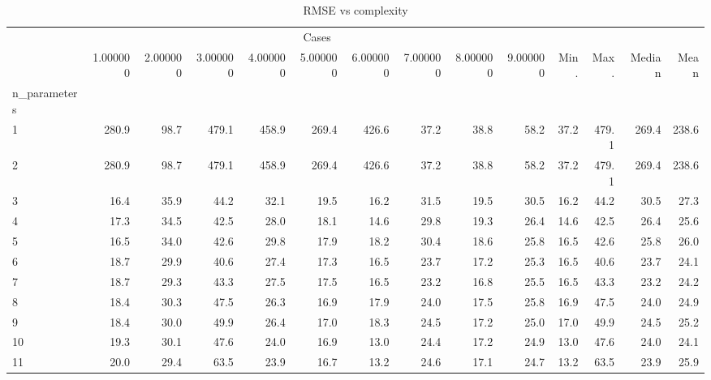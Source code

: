 \begin{table}[h]
\caption{RMSE vs complexity}
\label{tab:rmse_complexity}
\begin{tabular}{lrrrrrrrrrrrrr}
\toprule
 & \multicolumn{9}{c}{Cases} \\
\cmidrule(lr){2-10}
 & 1.000000 & 2.000000 & 3.000000 & 4.000000 & 5.000000 & 6.000000 & 7.000000 & 8.000000 & 9.000000 & Min. & Max. & Median & Mean \\
n_parameters &  &  &  &  &  &  &  &  &  &  &  &  &  \\
\midrule
1 & 280.9 & 98.7 & 479.1 & 458.9 & 269.4 & 426.6 & 37.2 & 38.8 & 58.2 & 37.2 & 479.1 & 269.4 & 238.6 \\
2 & 280.9 & 98.7 & 479.1 & 458.9 & 269.4 & 426.6 & 37.2 & 38.8 & 58.2 & 37.2 & 479.1 & 269.4 & 238.6 \\
3 & 16.4 & 35.9 & 44.2 & 32.1 & 19.5 & 16.2 & 31.5 & 19.5 & 30.5 & 16.2 & 44.2 & 30.5 & 27.3 \\
4 & 17.3 & 34.5 & 42.5 & 28.0 & 18.1 & 14.6 & 29.8 & 19.3 & 26.4 & 14.6 & 42.5 & 26.4 & 25.6 \\
5 & 16.5 & 34.0 & 42.6 & 29.8 & 17.9 & 18.2 & 30.4 & 18.6 & 25.8 & 16.5 & 42.6 & 25.8 & 26.0 \\
6 & 18.7 & 29.9 & 40.6 & 27.4 & 17.3 & 16.5 & 23.7 & 17.2 & 25.3 & 16.5 & 40.6 & 23.7 & 24.1 \\
7 & 18.7 & 29.3 & 43.3 & 27.5 & 17.5 & 16.5 & 23.2 & 16.8 & 25.5 & 16.5 & 43.3 & 23.2 & 24.2 \\
8 & 18.4 & 30.3 & 47.5 & 26.3 & 16.9 & 17.9 & 24.0 & 17.5 & 25.8 & 16.9 & 47.5 & 24.0 & 24.9 \\
9 & 18.4 & 30.0 & 49.9 & 26.4 & 17.0 & 18.3 & 24.5 & 17.2 & 25.0 & 17.0 & 49.9 & 24.5 & 25.2 \\
10 & 19.3 & 30.1 & 47.6 & 24.0 & 16.9 & 13.0 & 24.4 & 17.2 & 24.9 & 13.0 & 47.6 & 24.0 & 24.1 \\
11 & 20.0 & 29.4 & 63.5 & 23.9 & 16.7 & 13.2 & 24.6 & 17.1 & 24.7 & 13.2 & 63.5 & 23.9 & 25.9 \\
\bottomrule
\end{tabular}
\end{table}

